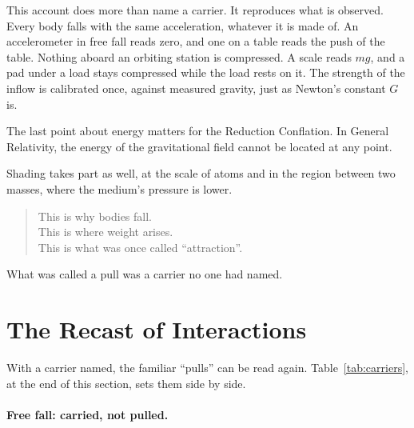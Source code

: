\documentclass[11pt,a4paper]{article}
\begin{document}
This account does more than name a carrier. It reproduces what is observed. Every body falls with the same acceleration, whatever it is made of. An accelerometer in free fall reads zero, and one on a table reads the push of the table. Nothing aboard an orbiting station is compressed. A scale reads $mg$, and a pad under a load stays compressed while the load rests on it. The strength of the inflow is calibrated once, against measured gravity, just as Newton's constant $G$ is. 

The last point about energy matters for the Reduction Conflation. In General Relativity, the energy of the gravitational field cannot be located at any point. 

Shading takes part as well, at the scale of atoms and in the region between two masses, where the medium's pressure is lower. 

\begin{quote}
This is why bodies fall.\\
This is where weight arises.\\
This is what was once called ``attraction''.
\end{quote}

What was called a pull was a carrier no one had named.

\section{The Recast of Interactions}

With a carrier named, the familiar ``pulls'' can be read again. Table~\ref{tab:carriers}, at the end of this section, sets them side by side.

\paragraph{Free fall: carried, not pulled.} 
\end{document}
